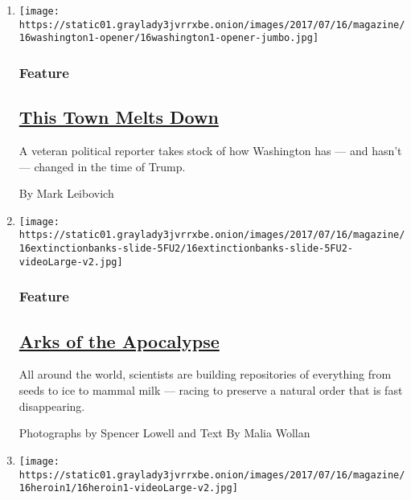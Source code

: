 \begin{enumerate}
\def\labelenumi{\arabic{enumi}.}
\item
  \texttt{[image: https://static01.graylady3jvrrxbe.onion/images/2017/07/16/magazine/16washington1-opener/16washington1-opener-jumbo.jpg]}

  \hypertarget{feature}{%
  \subsubsection{Feature}\label{feature}}

  \hypertarget{this-town-melts-down}{%
  \subsection{\texorpdfstring{\href{/2017/07/11/magazine/washington-dc-politics-trump-this-town-melts-down.html}{This
  Town Melts Down}}{This Town Melts Down}}\label{this-town-melts-down}}

  A veteran political reporter takes stock of how Washington has --- and
  hasn't --- changed in the time of Trump.

  By Mark Leibovich
\item
  \texttt{[image: https://static01.graylady3jvrrxbe.onion/images/2017/07/16/magazine/16extinctionbanks-slide-5FU2/16extinctionbanks-slide-5FU2-videoLarge-v2.jpg]}

  \hypertarget{feature-1}{%
  \subsubsection{Feature}\label{feature-1}}

  \hypertarget{arks-of-the-apocalypse}{%
  \subsection{\texorpdfstring{\href{/2017/07/13/magazine/seed-vault-extinction-banks-arks-of-the-apocalypse.html}{Arks
  of the
  Apocalypse}}{Arks of the Apocalypse}}\label{arks-of-the-apocalypse}}

  All around the world, scientists are building repositories of
  everything from seeds to ice to mammal milk --- racing to preserve a
  natural order that is fast disappearing.

  Photographs by Spencer Lowell and Text By Malia Wollan
\item
  \texttt{[image: https://static01.graylady3jvrrxbe.onion/images/2017/07/16/magazine/16heroin1/16heroin1-videoLarge-v2.jpg]}


\end{enumerate}
